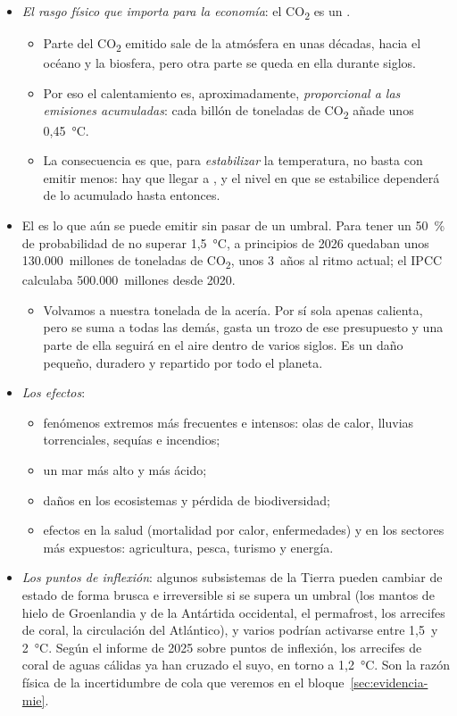 \documentclass[11pt]{article}
\begin{document}
\begin{itemize}
\item \emph{El rasgo físico que importa para la economía}: el CO\textsubscript{2} es un .
  \begin{itemize}
  \item Parte del CO\textsubscript{2} emitido sale de la atmósfera en unas décadas, hacia el océano y la biosfera, pero otra parte se queda en ella durante siglos.
  \item Por eso el calentamiento es, aproximadamente, \emph{proporcional a las emisiones acumuladas}: cada billón de toneladas de CO\textsubscript{2} añade unos 0,45~°C\nocite{IPCC2021SPM}.
  \item La consecuencia es que, para \emph{estabilizar} la temperatura, no basta con emitir menos: hay que llegar a , y el nivel en que se estabilice dependerá de lo acumulado hasta entonces.
  \end{itemize}
\item El  es lo que aún se puede emitir sin pasar de un umbral. Para tener un 50~\% de probabilidad de no superar 1,5~°C, a principios de 2026 quedaban unos 130.000~millones de toneladas de CO\textsubscript{2}, unos 3~años al ritmo actual\nocite{Forster2026Indicators}; el IPCC calculaba 500.000~millones desde 2020\nocite{IPCC2023SYR}.
  \begin{itemize}
  \item Volvamos a nuestra tonelada de la acería. Por sí sola apenas calienta, pero se suma a todas las demás, gasta un trozo de ese presupuesto y una parte de ella seguirá en el aire dentro de varios siglos. Es un daño pequeño, duradero y repartido por todo el planeta.
  \end{itemize}
\item \emph{Los efectos}\nocite{IPCC2023SYR}:
  \begin{itemize}
  \item fenómenos extremos más frecuentes e intensos: olas de calor, lluvias torrenciales, sequías e incendios;
  \item un mar más alto y más ácido;
  \item daños en los ecosistemas y pérdida de biodiversidad;
  \item efectos en la salud (mortalidad por calor, enfermedades) y en los sectores más expuestos: agricultura, pesca, turismo y energía.
  \end{itemize}
\item \emph{Los puntos de inflexión}: algunos subsistemas de la Tierra pueden cambiar de estado de forma brusca e irreversible si se supera un umbral (los mantos de hielo de Groenlandia y de la Antártida occidental, el permafrost, los arrecifes de coral, la circulación del Atlántico), y varios podrían activarse entre 1,5~y 2~°C\nocite{ArmstrongMcKay2022Exceeding}. Según el informe de 2025 sobre puntos de inflexión, los arrecifes de coral de aguas cálidas ya han cruzado el suyo, en torno a 1,2~°C\nocite{Lenton2025GTPR}. Son la razón física de la incertidumbre de cola que veremos en el bloque~\ref{sec:evidencia-mie}.

\end{itemize}
\end{document}
